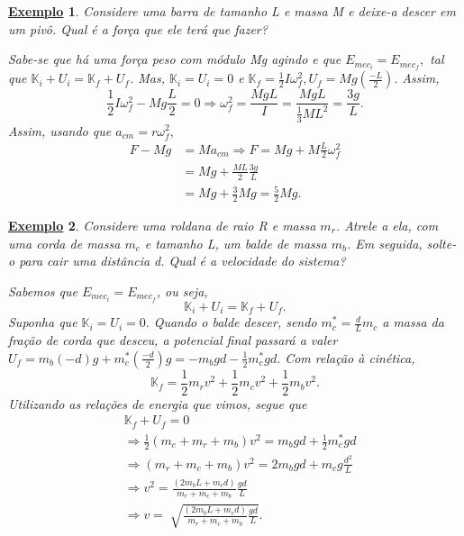 \documentclass{article}
\newtheorem{example}{\underline{Exemplo}}
\begin{document}
\begin{example}
  Considere uma barra de tamanho L e massa M e deixe-a descer em um pivô. Qual é a força que ele terá que fazer?

  Sabe-se que há uma força peso com módulo Mg agindo e que \(E_{mec_{i}} = E_{mec_{f}},\) tal que \(\mathbb{K}_{i} + U_{i} = \mathbb{K}_{f} + U_{f}\).
Mas, \(\mathbb{K}_{i} = U_{i} = 0\) e \(\mathbb{K}_{f} = \frac{1}{2}I\omega_{f}^{2}, U_{f} = Mg(\frac{-L}{2}).\) Assim, 
  \[
    \frac{1}{2}I\omega_{f}^{2} - Mg \frac{L}{2} = 0 \Rightarrow \omega_{f}^{2} = \frac{MgL}{I} = \frac{MgL}{\frac{1}{3}ML^{2}} = \frac{3g}{L}.
  \]
  Assim, usando que \(a_{cm} = r\omega_{f}^{2},\)
 \begin{align*}
   F- Mg &= Ma_{cm} \Rightarrow F = Mg + M \frac{L}{2}\omega_{f}^{2}\\
         &= Mg + \frac{ML}{2}\frac{3g}{L}\\
         &=Mg + \frac{3}{2}Mg = \frac{5}{2}Mg.
 \end{align*}
\end{example}
\begin{example}
  Considere uma roldana de raio R e massa \(m_{r}\). Atrele a ela, com uma corda de massa \(m_{c}\) e tamanho L, um balde de massa \(m_{b}\). 
Em seguida, solte-o para cair uma distância d. Qual é a velocidade do sistema?

  Sabemos que \(E_{mec_i} = E_{mec_f}\), ou seja, 
    \[
      \mathbb{K}_{i} + U_{i} = \mathbb{K}_{f} + U_{f}.
    \]
  Suponha que \(\mathbb{K}_{i} = U_{i} = 0.\) Quando o balde descer, sendo \(m_{c}^{*} = \frac{d}{L}m_{c}\) a massa da fração de corda que desceu, a potencial final passará a valer
 \(U_{f} = m_{b}(-d)g + m_{c}^{*}(\frac{-d}{2})g = -m_{b}gd - \frac{1}{2}m_{c}^{*}gd.\) Com relação à cinética, 
   \[
     \mathbb{K}_{f} = \frac{1}{2}m_{r}v^{2} + \frac{1}{2}m_{c}v^{2} + \frac{1}{2}m_{b}v^{2}.
   \]
   Utilizando as relações de energia que vimos, segue que 
  \begin{align*}
    &\mathbb{K}_{f} + U_{f} = 0\\
    &\Rightarrow \frac{1}{2}(m_{c}+m_{r}+m_{b})v^{2} = m_{b}gd + \frac{1}{2}m_{c}^{*}gd\\
    &\Rightarrow (m_{r}+m_{c}+m_{b})v^{2} = 2m_{b}gd + m_{c}g \frac{d^{2}}{L}\\
    &\Rightarrow v^{2} = \frac{(2m_{b}L + m_{c}d)}{m_{r}+m_{c}+m_{b}}\frac{gd}{L}\\
    &\Rightarrow v = \sqrt[]{\frac{(2m_{b}L + m_{c}d)}{m_{r}+m_{c}+m_{b}}\frac{gd}{L}}.
  \end{align*}
\end{example}
\newpage
\end{document}
